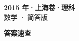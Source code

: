\documentclass[zihao=-4, a4paper]{ctexart}
\begin{document}
\begin{center}
  {\Large\bfseries 2015 年·上海卷·理科}\\[4pt]
  {\large 数学 · 简答版}
\end{center}
\medskip
{}

\clearpage
{}
\begin{center}{\Large\bfseries 答案速查}\end{center}
\medskip

\end{document}
